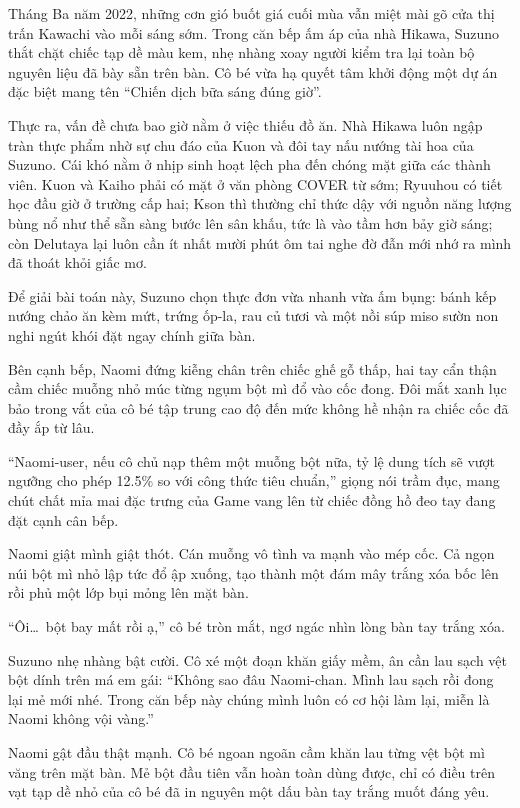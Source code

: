 ﻿\documentclass[../main.tex]{subfiles}
\begin{document}
Tháng Ba năm 2022, những cơn gió buốt giá cuối mùa vẫn miệt mài gõ cửa thị trấn Kawachi vào mỗi sáng sớm. Trong căn bếp ấm áp của nhà Hikawa, Suzuno thắt chặt chiếc tạp dề màu kem, nhẹ nhàng xoay người kiểm tra lại toàn bộ nguyên liệu đã bày sẵn trên bàn. Cô bé vừa hạ quyết tâm khởi động một dự án đặc biệt mang tên ``Chiến dịch bữa sáng đúng giờ''.

Thực ra, vấn đề chưa bao giờ nằm ở việc thiếu đồ ăn. Nhà Hikawa luôn ngập tràn thực phẩm nhờ sự chu đáo của Kuon và đôi tay nấu nướng tài hoa của Suzuno. Cái khó nằm ở nhịp sinh hoạt lệch pha đến chóng mặt giữa các thành viên. Kuon và Kaiho phải có mặt ở văn phòng COVER từ sớm; Ryuuhou có tiết học đầu giờ ở trường cấp hai; Kson thì thường chỉ thức dậy với nguồn năng lượng bùng nổ như thể sẵn sàng bước lên sân khấu, tức là vào tầm hơn bảy giờ sáng; còn Delutaya lại luôn cần ít nhất mười phút ôm tai nghe đờ đẫn mới nhớ ra mình đã thoát khỏi giấc mơ.

Để giải bài toán này, Suzuno chọn thực đơn vừa nhanh vừa ấm bụng: bánh kếp nướng chảo ăn kèm mứt, trứng ốp-la, rau củ tươi và một nồi súp miso sườn non nghi ngút khói đặt ngay chính giữa bàn.

Bên cạnh bếp, Naomi đứng kiễng chân trên chiếc ghế gỗ thấp, hai tay cẩn thận cầm chiếc muỗng nhỏ múc từng ngụm bột mì đổ vào cốc đong. Đôi mắt xanh lục bảo trong vắt của cô bé tập trung cao độ đến mức không hề nhận ra chiếc cốc đã đầy ắp từ lâu.

``Naomi-user, nếu cô chủ nạp thêm một muỗng bột nữa, tỷ lệ dung tích sẽ vượt ngưỡng cho phép 12.5\% so với công thức tiêu chuẩn,'' giọng nói trầm đục, mang chút chất mỉa mai đặc trưng của Game vang lên từ chiếc đồng hồ đeo tay đang đặt cạnh cân bếp.

Naomi giật mình giật thót. Cán muỗng vô tình va mạnh vào mép cốc. Cả ngọn núi bột mì nhỏ lập tức đổ ập xuống, tạo thành một đám mây trắng xóa bốc lên rồi phủ một lớp bụi mỏng lên mặt bàn.

``Ôi\dots\ bột bay mất rồi ạ,'' cô bé tròn mắt, ngơ ngác nhìn lòng bàn tay trắng xóa.

Suzuno nhẹ nhàng bật cười. Cô xé một đoạn khăn giấy mềm, ân cần lau sạch vệt bột dính trên má em gái: ``Không sao đâu Naomi-chan. Mình lau sạch rồi đong lại mẻ mới nhé. Trong căn bếp này chúng mình luôn có cơ hội làm lại, miễn là Naomi không vội vàng.''

Naomi gật đầu thật mạnh. Cô bé ngoan ngoãn cầm khăn lau từng vệt bột mì văng trên mặt bàn. Mẻ bột đầu tiên vẫn hoàn toàn dùng được, chỉ có điều trên vạt tạp dề nhỏ của cô bé đã in nguyên một dấu bàn tay trắng muốt đáng yêu.
\end{document}
